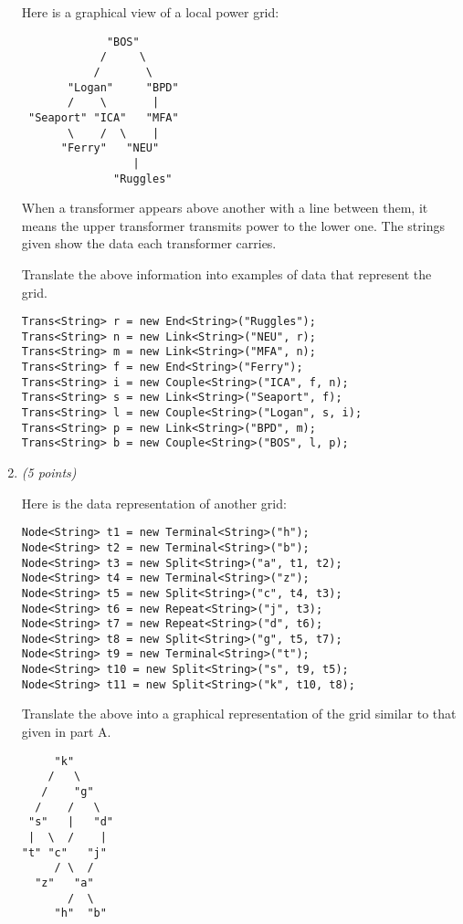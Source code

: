 \documentclass[11pt]{article}
\newcounter{Pctr}
\newenvironment{problem}{\stepcounter{Pctr}%
\begin{description}
\item[\noindent{\bf Problem} \arabic{Pctr}] 
\end{description}}{\relax}
\begin{document}
\begin{problem}
\begin{enumerate}
Here is a graphical view of a local power grid:

\begin{verbatim}
             "BOS"
            /     \
           /       \
       "Logan"     "BPD"
       /    \       |
 "Seaport" "ICA"   "MFA"
       \    /  \    | 
      "Ferry"   "NEU"
                 |
              "Ruggles"
\end{verbatim}

When a transformer appears above another with a line between them, it
means the upper transformer transmits power to the lower one.  The
strings given show the data each transformer carries.

Translate the above information into examples of data that represent
the grid.

\begsol{\vspace{0.5in}}
\begin{verbatim}
Trans<String> r = new End<String>("Ruggles");
Trans<String> n = new Link<String>("NEU", r);
Trans<String> m = new Link<String>("MFA", n);
Trans<String> f = new End<String>("Ferry");
Trans<String> i = new Couple<String>("ICA", f, n);
Trans<String> s = new Link<String>("Seaport", f);
Trans<String> l = new Couple<String>("Logan", s, i);
Trans<String> p = new Link<String>("BPD", m);
Trans<String> b = new Couple<String>("BOS", l, p);
\end{verbatim}
\endsol

\newpage
\item  {\em{(5 points)}}

Here is the data representation of another grid:

\begin{verbatim}
Node<String> t1 = new Terminal<String>("h");
Node<String> t2 = new Terminal<String>("b");
Node<String> t3 = new Split<String>("a", t1, t2);
Node<String> t4 = new Terminal<String>("z");
Node<String> t5 = new Split<String>("c", t4, t3);
Node<String> t6 = new Repeat<String>("j", t3);
Node<String> t7 = new Repeat<String>("d", t6);
Node<String> t8 = new Split<String>("g", t5, t7);
Node<String> t9 = new Terminal<String>("t");
Node<String> t10 = new Split<String>("s", t9, t5);
Node<String> t11 = new Split<String>("k", t10, t8);
\end{verbatim}

Translate the above into a graphical representation of the grid
similar to that given in part A.

\begsol{\vspace{0.5in}}
\begin{verbatim}
     "k"
    /   \
   /    "g"
  /    /   \
 "s"   |   "d"     
 |  \  /    |     
"t" "c"   "j"  
     / \  /
  "z"   "a" 
       /  \
     "h"  "b"
\end{verbatim}
\endsol



\end{enumerate}
\end{problem}
\end{document}
